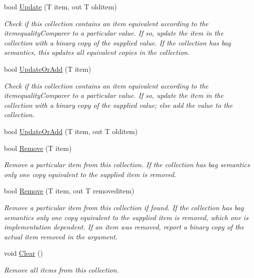 \begin{DoxyCompactItemize}
bool \hyperlink{class_c5_1_1_tree_set_a197ce45efaebf3011910aafba91c5204}{Update} (T item, out T olditem)
\begin{DoxyCompactList}\small\item\em Check if this collection contains an item equivalent according to the itemequality\+Comparer to a particular value. If so, update the item in the collection with a binary copy of the supplied value. If the collection has bag semantics, this updates all equivalent copies in the collection. \end{DoxyCompactList}\item 
bool \hyperlink{class_c5_1_1_tree_set_a3ec0ca0c5389b8c911af08a69de8b923}{Update\+Or\+Add} (T item)
\begin{DoxyCompactList}\small\item\em Check if this collection contains an item equivalent according to the itemequality\+Comparer to a particular value. If so, update the item in the collection with a binary copy of the supplied value; else add the value to the collection. \end{DoxyCompactList}\item 
bool \hyperlink{class_c5_1_1_tree_set_a2769676af15081ee410f3a30aedb1c06}{Update\+Or\+Add} (T item, out T olditem)
\item 
bool \hyperlink{class_c5_1_1_tree_set_acc2195583c6e6b20ebe2fba3837ac103}{Remove} (T item)
\begin{DoxyCompactList}\small\item\em Remove a particular item from this collection. If the collection has bag semantics only one copy equivalent to the supplied item is removed. \end{DoxyCompactList}\item 
bool \hyperlink{class_c5_1_1_tree_set_aa4e7e4d3479ebd289308ba8f9c239bad}{Remove} (T item, out T removeditem)
\begin{DoxyCompactList}\small\item\em Remove a particular item from this collection if found. If the collection has bag semantics only one copy equivalent to the supplied item is removed, which one is implementation dependent. If an item was removed, report a binary copy of the actual item removed in the argument. \end{DoxyCompactList}\item 
void \hyperlink{class_c5_1_1_tree_set_ae09b116f49bc00c9775c5799fd3a8ccf}{Clear} ()
\begin{DoxyCompactList}\small\item\em Remove all items from this collection. \end{DoxyCompactList}\item 

\end{DoxyCompactItemize}
